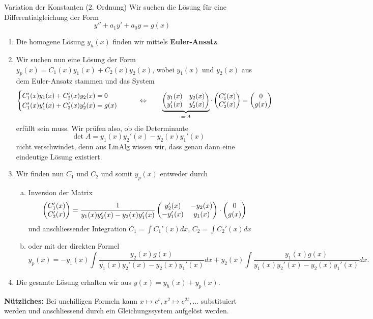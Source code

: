 \begin{Rezept}{Variation der Konstanten (2. Ordnung)}{}
	Wir suchen die Lösung für eine Differentialgleichung der Form
	\begin{equation*}
	y'' + a_1 y' + a_0 y = g(x)
	\end{equation*}
	\begin{enumerate}
		\item Die homogene Lösung $y_h(x)$ finden wir mittels \textbf{Euler-Ansatz}.
		\item Wir suchen nun eine Lösung der Form $y_p(x) = C_1(x) y_1(x) + C_2(x) y_2(x)$, wobei $y_1(x)$ und $y_2(x)$ aus dem Euler-Ansatz stammen und das System
		\begin{equation*}
		\begin{cases} C_1'(x)y_1(x) + C_2'(x)y_2(x)=0\\C_1'(x)y_1'(x) + C_2'(x)y_2'(x)=g(x)\end{cases}
		\qquad \Leftrightarrow \qquad \underbrace{\begin{pmatrix}
			y_1(x) &y_2(x)\\y_1'(x) &y_2'(x)
			\end{pmatrix}}_{=:A} \cdot \begin{pmatrix} C_1'(x) \\ C_2'(x)\end{pmatrix} = \begin{pmatrix} 0 \\ g(x)\end{pmatrix}
		\end{equation*}
		erfüllt sein muss. Wir prüfen also, ob die Determinante
		\begin{equation*}
		\det A = y_1(x)y_2'(x)-y_2(x)y_1'(x)
		\end{equation*}
		nicht verschwindet, denn aus LinAlg wissen wir, dass genau dann eine eindeutige Lösung existiert.
		\item  Wir finden nun $C_1$ und $C_2$ und somit $y_p(x)$ entweder durch
		\begin{enumerate}[(a)]
			\item Inversion der Matrix \begin{equation*}
			\begin{pmatrix} C_1'(x) \\ C_2'(x)\end{pmatrix} = \frac{1}{y_1(x)y_2'(x)-y_2(x)y_1'(x)} \begin{pmatrix}
			y_2'(x) & -y_2(x)\\-y_1'(x) &y_1(x)
			\end{pmatrix}\cdot\begin{pmatrix} 0 \\ g(x)\end{pmatrix}
			\end{equation*}
			und anschliessender Integration $C_1 = \int C_1'(x) dx$, $C_2 = \int C_2'(x) dx$ 
			\item oder mit der direkten Formel
			\begin{equation*}
			y_p(x) = -y_1(x) \int \frac{y_2(x) g(x)}{y_1(x)y_2'(x)-y_2(x)y_1'(x)} dx + y_2(x) \int \frac{y_1(x) g(x)}{y_1(x)y_2'(x)-y_2(x)y_1'(x)}dx.
			\end{equation*}
		\end{enumerate}
		\item Die gesamte Lösung erhalten wir aus $y(x) = y_h(x) + y_p(x)$.
	\end{enumerate}
	
	\textbf{Nützliches:} Bei unchilligen Formeln kann $x\mapsto e^t, x^2\mapsto e^{2t},...$ substituiert werden und anschliessend durch ein Gleichungssystem aufgelöst werden.
\end{Rezept}

